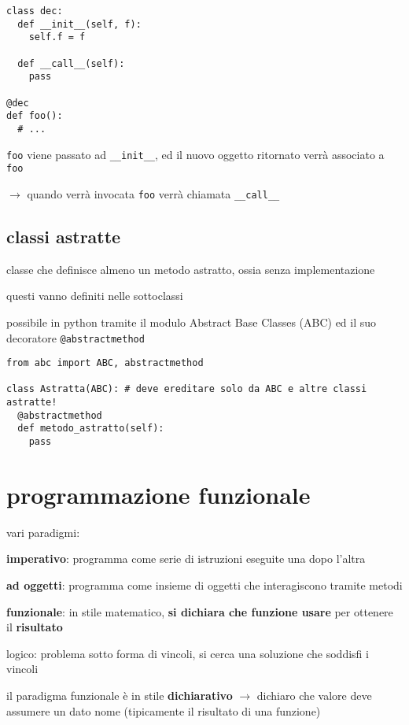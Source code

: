 \begin{verbatim}
class dec:
  def __init__(self, f):
    self.f = f

  def __call__(self):
    pass
  
@dec
def foo():
  # ...
\end{verbatim}

\texttt{foo} viene passato ad \texttt{__init__}, ed il nuovo oggetto ritornato verr\`a associato a \texttt{foo}

$\rightarrow$ quando verr\`a invocata \texttt{foo} verr\`a chiamata \texttt{__call__}

\subsection{classi astratte}

classe che definisce almeno un metodo astratto, ossia senza implementazione

questi vanno definiti nelle sottoclassi

possibile in python tramite il modulo Abstract Base Classes (ABC) ed il suo decoratore \texttt{@abstractmethod}

\begin{verbatim}
from abc import ABC, abstractmethod

class Astratta(ABC): # deve ereditare solo da ABC e altre classi astratte!
  @abstractmethod
  def metodo_astratto(self):
    pass
\end{verbatim}

\section{programmazione funzionale}

vari paradigmi:

\textbf{imperativo}: programma come serie di istruzioni eseguite una dopo l'altra

\textbf{ad oggetti}: programma come insieme di oggetti che interagiscono tramite metodi

\textbf{funzionale}: in stile matematico, \textbf{si dichiara che funzione usare} per ottenere il \textbf{risultato}

logico: problema sotto forma di vincoli, si cerca una soluzione che soddisfi i vincoli

il paradigma funzionale \`e in stile \textbf{dichiarativo} $\rightarrow$ dichiaro che valore deve assumere un dato nome (tipicamente il risultato di una funzione)

